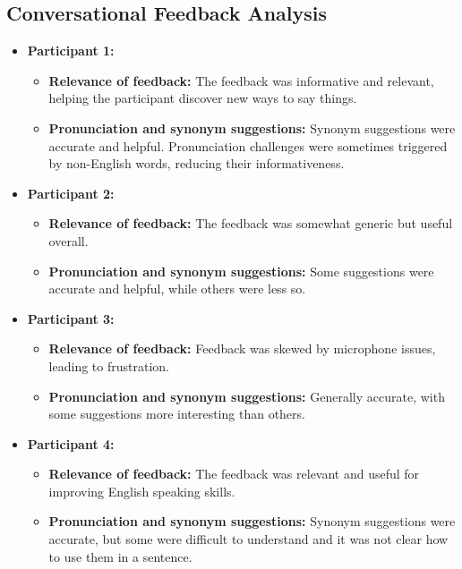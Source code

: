 \documentclass{article}
\begin{document}
\subsection{Conversational Feedback Analysis}
\begin{itemize}
    \item \textbf{Participant 1:}
    \begin{itemize}
        \item \textbf{Relevance of feedback:} The feedback was informative and relevant, helping the participant discover new ways to say things.
        \item \textbf{Pronunciation and synonym suggestions:} Synonym suggestions were accurate and helpful. Pronunciation challenges were sometimes triggered by non-English words, reducing their informativeness.
    \end{itemize}
    \item \textbf{Participant 2:}
    \begin{itemize}
        \item \textbf{Relevance of feedback:} The feedback was somewhat generic but useful overall.
        \item \textbf{Pronunciation and synonym suggestions:} Some suggestions were accurate and helpful, while others were less so.
    \end{itemize}
    \item \textbf{Participant 3:}
    \begin{itemize}
        \item \textbf{Relevance of feedback:} Feedback was skewed by microphone issues, leading to frustration.
        \item \textbf{Pronunciation and synonym suggestions:} Generally accurate, with some suggestions more interesting than others.
    \end{itemize}
    \item \textbf{Participant 4:}
    \begin{itemize}
        \item \textbf{Relevance of feedback:} The feedback was relevant and useful for improving English speaking skills.
        \item \textbf{Pronunciation and synonym suggestions:} Synonym suggestions were accurate, but some were difficult to understand and it was not clear how to use them in a sentence.
    \end{itemize}
\end{itemize}
\end{document}
